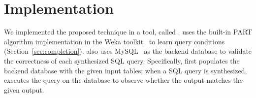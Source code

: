 
\section{Implementation}
\label{sec:implementation}

We implemented the proposed technique in a tool, called \ourtool. 
\ourtool uses the built-in PART algorithm implementation in
the Weka toolkit~\cite{Hall:2009} to learn query conditions
(Section~\ref{sec:completion}). \ourtool also uses
MySQL~\cite{mysql} as the backend
database to validate the correctness of each synthesized 
SQL query. Specifically, \ourtool first populates the backend database
with the given input tables; when a SQL query is
synthesized, \ourtool executes the query on the database
to observe whether the output matches the given output.
